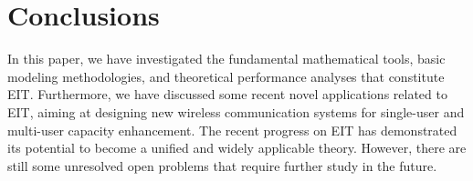 \documentclass[journal,twocolumn]{IEEEtran}
\begin{document}


\section{Conclusions}
In this paper, we have investigated the fundamental mathematical tools, basic modeling methodologies, and theoretical performance analyses that constitute EIT. 
Furthermore, we have discussed some recent novel applications related to EIT, aiming at designing new wireless communication systems for single-user and multi-user capacity enhancement. 
The recent progress on EIT has demonstrated its potential to become a unified and widely applicable theory. However, there are still some unresolved open problems that require further study in the future. 


\footnotesize



\end{document}
